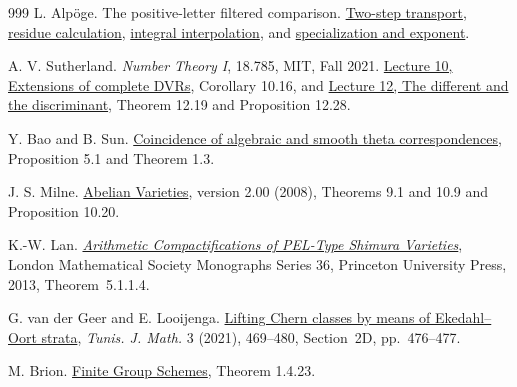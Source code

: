 \documentclass[11pt]{article}
\theoremstyle{definition}
\theoremstyle{plain}
\begin{document}
\begin{thebibliography}{999}
 L. Alp\"oge.
The positive-letter filtered comparison.
\href{https://github.com/TomasOrtega/RH/blob/a6ac91a412dcbaab31801355ec5707024a71bf65/extracted/lean/src/Formalism/SharpRestriction/LevelLetterCocycles/PullbackLevelTwoToOne.lean#L142}{Two-step transport},
\href{https://github.com/TomasOrtega/RH/blob/a6ac91a412dcbaab31801355ec5707024a71bf65/extracted/lean/src/Formalism/SharpRestriction/LevelLetterCocycles/QuotientImageDivisibility/ResiduePi0EqNegPrime.lean#L201}{residue calculation},
\href{https://github.com/TomasOrtega/RH/blob/a6ac91a412dcbaab31801355ec5707024a71bf65/extracted/lean/src/Formalism/SharpRestriction/LevelLetterCocycles/DerivativeProdSubEval.lean#L58}{integral interpolation},
and \href{https://github.com/TomasOrtega/RH/blob/a6ac91a412dcbaab31801355ec5707024a71bf65/extracted/lean/src/Formalism/SharpRestriction/LevelLetterCocycles/LemmaGsOfLemGAB.lean#L65}{specialization and exponent}.

A. V. Sutherland. \emph{Number Theory I}, 18.785, MIT, Fall 2021.
\href{https://math.mit.edu/classes/18.785/2021fa/LectureNotes10.pdf}{Lecture 10,
Extensions of complete DVRs}, Corollary 10.16, and
\href{https://math.mit.edu/classes/18.785/2021fa/LectureNotes12.pdf}{Lecture 12,
The different and the discriminant}, Theorem 12.19 and Proposition 12.28.

Y. Bao and B. Sun.
\href{https://arxiv.org/abs/1611.06298}{Coincidence of algebraic and
smooth theta correspondences}, Proposition 5.1 and Theorem 1.3.

J. S. Milne. \href{https://www.jmilne.org/math/CourseNotes/AV.pdf}{Abelian
Varieties}, version 2.00 (2008), Theorems 9.1 and 10.9 and Proposition 10.20.

K.-W. Lan. \href{https://www.kwlan.org/articles/cpt-PEL-type-thesis-revision-dense.pdf}
{\emph{Arithmetic Compactifications of PEL-Type Shimura Varieties}},
London Mathematical Society Monographs Series 36, Princeton University
Press, 2013, Theorem~5.1.1.4.

G. van der Geer and E. Looijenga.
\href{https://doi.org/10.2140/tunis.2021.3.469}{Lifting Chern classes
by means of Ekedahl--Oort strata}, \emph{Tunis. J. Math.} 3 (2021),
469--480, Section~2D, pp.~476--477.

M. Brion. \href{https://www-fourier.univ-grenoble-alpes.fr/~mbrion/FiniteGroupSchemes.pdf}
{Finite Group Schemes}, Theorem 1.4.23.


\end{thebibliography}
\end{document}
